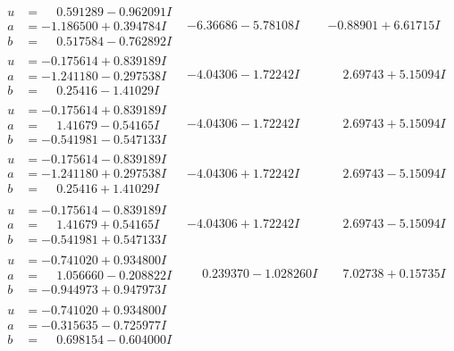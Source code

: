 \documentclass[1p]{elsarticle_modified}
\theoremstyle{definition}
\begin{document}
$$\begin{array}{c|c|c}
\begin{aligned}
u &= \phantom{-}0.591289 - 0.962091 I \\
a &= -1.186500 + 0.394784 I \\
b &= \phantom{-}0.517584 - 0.762892 I\end{aligned}
 & -6.36686 - 5.78108 I & -0.88901 + 6.61715 I \\ \hline\begin{aligned}
u &= -0.175614 + 0.839189 I \\
a &= -1.241180 - 0.297538 I \\
b &= \phantom{-}0.25416 - 1.41029 I\end{aligned}
 & -4.04306 - 1.72242 I & \phantom{-}2.69743 + 5.15094 I \\ \hline\begin{aligned}
u &= -0.175614 + 0.839189 I \\
a &= \phantom{-}1.41679 - 0.54165 I \\
b &= -0.541981 - 0.547133 I\end{aligned}
 & -4.04306 - 1.72242 I & \phantom{-}2.69743 + 5.15094 I \\ \hline\begin{aligned}
u &= -0.175614 - 0.839189 I \\
a &= -1.241180 + 0.297538 I \\
b &= \phantom{-}0.25416 + 1.41029 I\end{aligned}
 & -4.04306 + 1.72242 I & \phantom{-}2.69743 - 5.15094 I \\ \hline\begin{aligned}
u &= -0.175614 - 0.839189 I \\
a &= \phantom{-}1.41679 + 0.54165 I \\
b &= -0.541981 + 0.547133 I\end{aligned}
 & -4.04306 + 1.72242 I & \phantom{-}2.69743 - 5.15094 I \\ \hline\begin{aligned}
u &= -0.741020 + 0.934800 I \\
a &= \phantom{-}1.056660 - 0.208822 I \\
b &= -0.944973 + 0.947973 I\end{aligned}
 & \phantom{-}0.239370 - 1.028260 I & \phantom{-}7.02738 + 0.15735 I \\ \hline\begin{aligned}
u &= -0.741020 + 0.934800 I \\
a &= -0.315635 - 0.725977 I \\
b &= \phantom{-}0.698154 - 0.604000 I\end{aligned}

\end{array}$$
\end{document}
